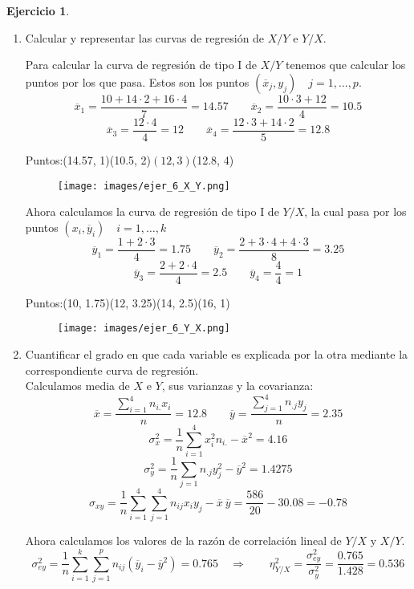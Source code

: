 \documentclass[a4paper, 12pt]{article}
\theoremstyle{definition}
\newtheorem{ej}{Ejercicio}
\begin{document}
\begin{ej}
\begin{enumerate}[label=\alph*)]
	
	\item Calcular y representar las curvas de regresión de \(X/Y\) e \(Y/X\).
	
	Para calcular la curva de regresión de tipo I de \(X/Y\) tenemos que calcular los puntos por los que pasa. Estos son los puntos \((\overline{x}_j, y_j) \quad j=1,\dotsc, p.\)
\[
	\overline{x}_1 = \frac{10 + 14 \cdot 2 + 16 \cdot4}{7} = 14.57 \qquad \overline{x}_2 = \frac{10 \cdot 3 + 12}{4} = 10.5
\]
\[
	\overline{x}_3 = \frac{12 \cdot 4}{4} = 12 \qquad \overline{x}_4 = \frac{12 \cdot 3 + 14 \cdot 2}{5} = 12.8
\]

Puntos:\qquad(14.57, 1)\qquad(10.5, 2)\qquad\((12, 3)\)\qquad(12.8, 4)


\begin{figure}[h!]
\centering
\texttt{[image: images/ejer\_6\_X\_Y.png]}
\end{figure}

Ahora calculamos la curva de regresión de tipo I de \(Y/X\), la cual pasa por los puntos \((x_i, \overline{y}_i) \quad i=1,\dotsc,k\)
\[
	\overline{y}_{1} = \frac{1 + 2 \cdot 3}{4} = 1.75 \qquad \overline{y}_{2} = \frac{2 + 3 \cdot 4 + 4 \cdot 3}{8} = 3.25
\]
\[
	\overline{y}_{3} = \frac{2 + 2 \cdot 4}{4} = 2.5 \qquad \overline{y}_{4} = \frac{4}{4} = 1
\]

Puntos:\qquad(10, 1.75)\qquad(12, 3.25)\qquad(14, 2.5)\qquad(16, 1)

\begin{figure}[h!]
\centering
\texttt{[image: images/ejer\_6\_Y\_X.png]}
\end{figure}

	\item Cuantificar el grado en que cada variable es explicada por la otra mediante la correspondiente curva de regresión. \\
	
	Calculamos media de $X$ e $Y$, sus varianzas y la covarianza:
	\[
	\overline{x} = \frac{\sum_{i=1}^{4} n_{i.} x_i}{n} = 12.8 \qquad \overline{y} = \frac{\sum_{j=1}^{4} n_{.j} y_j}{n} = 2.35
\]
\[
	\sigma_x^2 = \frac{1}{n} \sum_{i=1}^{4} x_i^2 n_{i.} - \overline{x}^2 = 4.16
\]
\[
	\sigma_y^2 = \frac{1}{n} \sum_{j=1} n_{.j} y_j^2 - \overline{y}^2 = 1.4275
\]
\[
	\sigma_{xy} = \frac{1}{n} \sum_{i=1}^{4} \sum_{j=1}^{4} n_{ij} x_i y_j - \overline{x}\ \overline{y} = \frac{586}{20}-30.08 = -0.78
\]
	
	Ahora calculamos los valores de la razón de correlación lineal de \(Y/X\) y \(X/Y\).
\[
	\sigma_{ey}^2=\frac{1}{n}\sum_{i=1}^k\sum_{j=1}^p n_{ij}(\overline{y}_i - \overline{y}^2) = 0.765\quad\Longrightarrow\qquad
	\eta_{Y/X}^{2} = \frac{\sigma_{ey}^2}{\sigma_y^2} = \frac{0.765}{1.428} = 0.536 
\]


\end{enumerate}
\end{ej}
\end{document}
